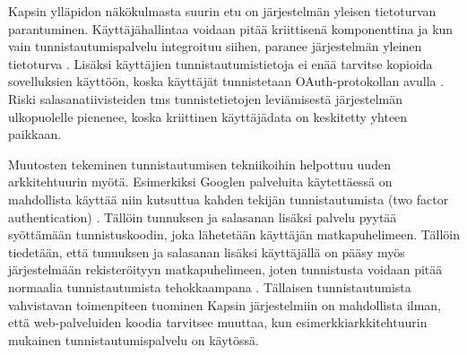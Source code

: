 Kapsin ylläpidon näkökulmasta suurin etu on järjestelmän yleisen tietoturvan parantuminen. Käyttäjähallintaa voidaan pitää kriittisenä komponenttina ja kun vain tunnistautumispalvelu integroituu siihen, paranee järjestelmän yleinen tietoturva \cite{arkkitehtuurit}. Lisäksi käyttäjien tunnistautumistietoja ei enää tarvitse kopioida sovelluksien käyttöön, koska käyttäjät tunnistetaan OAuth-protokollan avulla \cite{oauth2_0}. Riski salasanatiivisteiden tms tunnistetietojen leviämisestä järjestelmän ulkopuolelle pienenee, koska kriittinen käyttäjädata on keskitetty yhteen paikkaan.

Muutosten tekeminen tunnistautumisen tekniikoihin helpottuu uuden arkkitehtuurin myötä. Esimerkiksi Googlen palveluita käytettäessä on mahdollista käyttää niin kutsuttua kahden tekijän tunnistautumista (two factor authentication) \cite{google_two_factor}. Tällöin tunnuksen ja salasanan lisäksi palvelu pyytää syöttämään tunnistuskoodin, joka lähetetään käyttäjän matkapuhelimeen. Tällöin tiedetään, että tunnuksen ja salasanan lisäksi käyttäjällä on pääsy myös järjestelmään rekisteröityyn matkapuhelimeen, joten tunnistusta voidaan pitää normaalia tunnistautumista tehokkaampana \cite{}. Tällaisen tunnistautumista vahvistavan toimenpiteen tuominen Kapsin järjestelmiin on mahdollista ilman, että web-palveluiden koodia tarvitsee muuttaa, kun esimerkkiarkkitehtuurin mukainen tunnistautumispalvelu on käytössä.